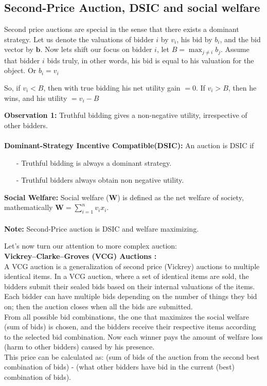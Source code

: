 \documentclass[a4paper]{article}
\begin{document}
\subsection*{Second-Price Auction, DSIC and social welfare \cite{stanford}}
Second price auctions are special in the sense that there exists a dominant strategy.
Let us denote the valuations of bidder $i$ by $v_i$, his bid by $b_i$, and the bid vector by $\mathbf{b}$. Now lets shift our focus on bidder $i$, let $B = \max_{j\ne i} b_j$. 
Assume that bidder $i$ bids truly, in other words, his bid is equal to his valuation for the object. Or $b_i = v_i$

So, if $v_i < B$, then with true bidding his net utility gain $= 0$. If $v_i > B$, then he wins, and his utility $= v_i - B$

\textbf{Observation 1:} Truthful bidding gives a non-negative utility, irrespective of other bidders.  \\ \\
\textbf{Dominant-Strategy Incentive Compatible(DSIC)\cite{stanford}:} An auction is DSIC if
\begin{itemize}
    \item[-] Truthful bidding is always a dominant strategy.
    \item[-] Truthful bidders always obtain non negative utility.
\end{itemize}
\textbf{Social Welfare\cite{stanford}:} Social welfare ($\mathbf{W}$) is defined as the net welfare of society, mathematically $\mathbf{W} = \sum_{i=1}^{n}v_i x_i$. \\ \\
\textbf{Note:} Second-Price auction is DSIC and welfare maximizing.


\pagebreak
Let's now turn our attention to more complex auction: \\

\textbf{ Vickrey–Clarke–Groves (VCG) Auctions \cite{vijay}:}\\

A VCG auction is a generalization of second price (Vickrey) auctions to multiple identical items. In a VCG auction, where a set of identical items are sold, the bidders submit their sealed bids based on their internal valuations of the items. Each bidder can have multiple bids depending on the number of things they bid on; then the auction closes when all the bids are submitted.
\\
From all possible bid combinations, the one that maximizes the social welfare (sum of bids) is chosen, and the bidders receive their respective items according to the selected bid combination. Now each winner pays the amount of welfare loss (harm to other bidders) caused by his presence. \cite{sponsored}
\\
This price can be calculated as: (sum of bids of the auction from the second best combination of bids) - (what other bidders have bid in the current (best) combination of bids).
\end{document}
